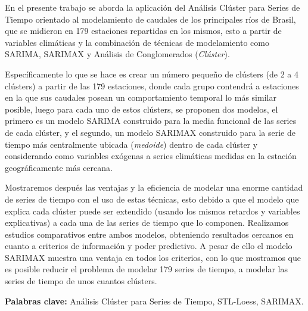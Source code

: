 \documentclass[12pt,oneside]{book}\usepackage[]{graphicx}\usepackage[]{color}
\theoremstyle{definition} %
\begin{document}
En el presente trabajo se aborda la aplicación del Análisis Clúster para Series de Tiempo orientado al modelamiento de caudales de los principales ríos de Brasil, que se midieron en 179 estaciones repartidas en los mismos, esto a partir de variables climáticas y la combinación de técnicas de modelamiento como SARIMA, SARIMAX y Análisis de Conglomerados (\textit{Clúster}).

Específicamente lo que se hace es crear un número pequeño de clústers (de 2 a 4 clústers) a partir de las 179 estaciones, donde cada grupo contendrá a estaciones en la que sus caudales posean un comportamiento temporal lo más similar posible, luego para cada uno de estos clústers, se proponen dos modelos, el primero es un modelo SARIMA construido para la media funcional de las series de cada clúster, y el segundo, un modelo SARIMAX construido para la serie de tiempo más centralmente ubicada (\textit{medoide}) dentro de cada clúster y considerando como variables exógenas a series climáticas medidas en la estación geográficamente más cercana. 

Mostraremos después las ventajas y la eficiencia de modelar una enorme cantidad de series de tiempo con el uso de estas técnicas, esto debido a que el modelo que explica cada clúster puede ser extendido (usando los mismos retardos y variables explicativas) a cada una de las series de tiempo que lo componen. 
Realizamos estudios comparativos entre ambos modelos, obteniendo resultados cercanos en cuanto a criterios de información y poder predictivo. A pesar de ello el modelo SARIMAX muestra una ventaja en todos los criterios,
con lo que mostramos que es posible reducir el problema de modelar 179 series de tiempo, a modelar las series de tiempo de unos cuantos clústers.


\vspace{5mm}

\textbf{Palabras clave:} Análisis Clúster para Series de Tiempo, STL-Loess, SARIMAX.
\end{document}
